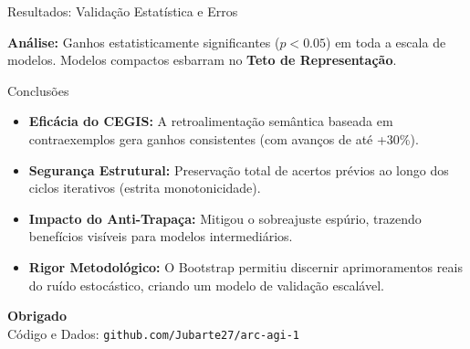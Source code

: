 \documentclass{beamer}
\begin{document}
\begin{frame}{Resultados: Validação Estatística e Erros}
    \begin{table}[ht]
        \centering
    \end{table}
    
    \vspace{0.3cm}
    \small \textbf{Análise:} Ganhos estatisticamente significantes ($p < 0.05$) em toda a escala de modelos. Modelos compactos esbarram no \textbf{Teto de Representação}.
\end{frame}

\begin{frame}{Conclusões}
    \begin{itemize}
        \item \textbf{Eficácia do CEGIS:} A retroalimentação semântica baseada em contraexemplos gera ganhos consistentes (com avanços de até +30\%).
        \item \textbf{Segurança Estrutural:} Preservação total de acertos prévios ao longo dos ciclos iterativos (estrita monotonicidade).
        \item \textbf{Impacto do Anti-Trapaça:} Mitigou o sobreajuste espúrio, trazendo benefícios visíveis para modelos intermediários.
        \item \textbf{Rigor Metodológico:} O Bootstrap permitiu discernir aprimoramentos reais do ruído estocástico, criando um modelo de validação escalável.
    \end{itemize}
\end{frame}

\begin{frame}
    \begin{center}
        \Huge \textbf{Obrigado} \\
        \vspace{0.8cm}
        \normalsize Código e Dados: \texttt{github.com/Jubarte27/arc-agi-1}
    \end{center}
\end{frame}
\end{document}
